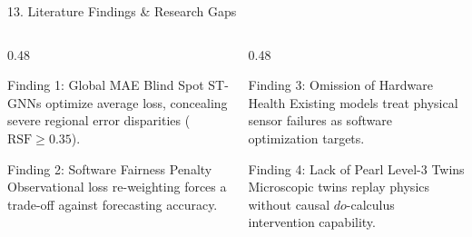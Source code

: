 \documentclass[aspectratio=169, 10pt]{beamer}
\begin{document}
\begin{frame}{13. Literature Findings \& Research Gaps}
  \begin{columns}
    \begin{column}{0.48\textwidth}
      \begin{block}{Finding 1: Global MAE Blind Spot}
        ST-GNNs optimize average loss, concealing severe regional error disparities ($\text{RSF} \ge 0.35$).
      \end{block}
      \begin{block}{Finding 2: Software Fairness Penalty}
        Observational loss re-weighting forces a trade-off against forecasting accuracy.
      \end{block}
    \end{column}
    \begin{column}{0.48\textwidth}
      \begin{block}{Finding 3: Omission of Hardware Health}
        Existing models treat physical sensor failures as software optimization targets.
      \end{block}
      \begin{block}{Finding 4: Lack of Pearl Level-3 Twins}
        Microscopic twins replay physics without causal $do$-calculus intervention capability.
      \end{block}
    \end{column}
  \end{columns}
\end{frame}
\end{document}
